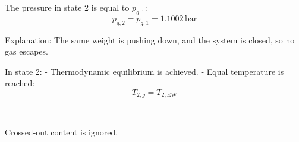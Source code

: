 The pressure in state 2 is equal to \( p_{g,1} \):  
\[
p_{g,2} = p_{g,1} = 1.1002 \, \text{bar}
\]  

Explanation:  
The same weight is pushing down, and the system is closed, so no gas escapes.  

In state 2:  
- Thermodynamic equilibrium is achieved.  
- Equal temperature is reached:  
\[
T_{2,g} = T_{2,\text{EW}}
\]  

---

Crossed-out content is ignored.